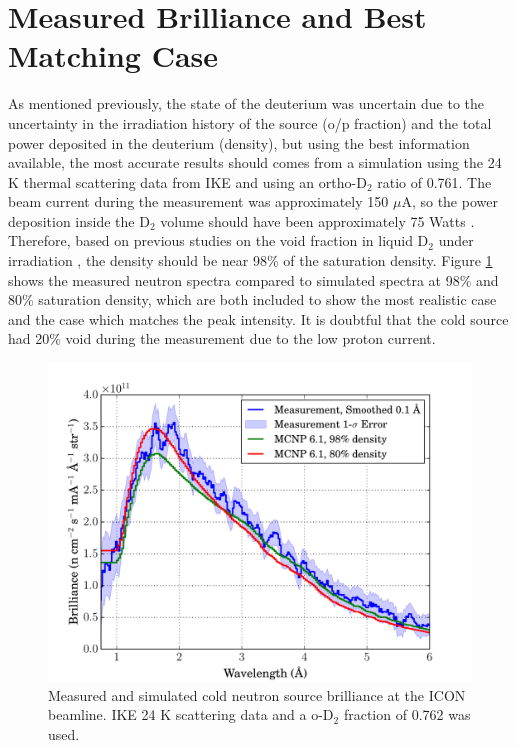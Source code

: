 \documentclass[5p,12pt]{elsarticle}
\begin{document}
%
%
%
%
%

\section{Measured Brilliance and Best Matching Case}
\label{sec:results}

As mentioned previously, the state of the deuterium was uncertain due to the uncertainty in the irradiation history of the source (o/p fraction) and the total power deposited in the deuterium (density), but using the best information available, the most accurate results should comes from a simulation using the 24 K thermal scattering data from IKE and using an ortho-D$_2$ ratio of 0.761.  The beam current during the measurement was approximately 150 $\mu$A, so the power deposition inside the D$_2$ volume should have been approximately 75 Watts \cite{sinq_power}.  Therefore, based on previous studies on the void fraction in liquid D$_2$ under irradiation \cite{Siegwarth_Olson_Lewis_Rowe_Williams_1994}, the density should be near 98\% of the saturation density.  Figure \ref{fig:brilliance} shows the measured neutron spectra compared to simulated spectra at 98\% and 80\% saturation density, which are both included to show the most realistic case and the case which matches the peak intensity.  It is doubtful that the cold source had 20\% void during the measurement due to the low proton current.

\begin{figure}[h!] 
  \centering
    \includegraphics[width=\columnwidth]{graphics/brightness.pdf}
     \caption{Measured and simulated cold neutron source brilliance at the ICON beamline.  IKE 24 K scattering data and a o-D$_2$ fraction of 0.762 was used. \label{fig:brilliance} }
\end{figure}
\end{document}
